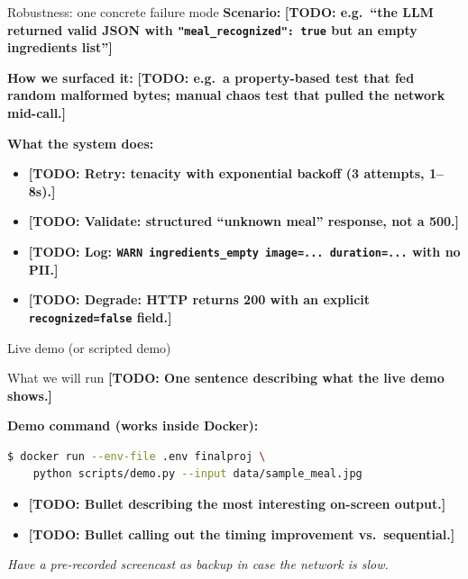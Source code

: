 \documentclass[aspectratio=169,11pt]{beamer}
\newcommand{\TODO}[1]{\textcolor{accent2}{\textbf{[TODO: #1]}}}
\begin{document}
\begin{frame}{Robustness: one concrete failure mode}
  \textbf{Scenario:} \TODO{e.g.\ ``the LLM returned valid JSON with \texttt{"meal\_recognized": true} but an empty ingredients list''}

  \vspace{0.3em}
  \textbf{How we surfaced it:} \TODO{e.g.\ a property-based test that fed random malformed bytes; manual chaos test that pulled the network mid-call.}

  \vspace{0.3em}
  \textbf{What the system does:}
  \begin{itemize}\setlength\itemsep{0.3em}
    \item \TODO{Retry: tenacity with exponential backoff (3 attempts, 1--8s).}
    \item \TODO{Validate: structured ``unknown meal'' response, not a 500.}
    \item \TODO{Log: \texttt{WARN ingredients\_empty image=... duration=...} with no PII.}
    \item \TODO{Degrade: HTTP returns 200 with an explicit \texttt{recognized=false} field.}
  \end{itemize}
\end{frame}

\begin{frame}[fragile]{Live demo (or scripted demo)}
  \begin{block}{What we will run}
    \TODO{One sentence describing what the live demo shows.}
  \end{block}

  \vspace{0.4em}
  \textbf{Demo command (works inside Docker):}
  \begin{lstlisting}[style=python,language=bash,numbers=none]
$ docker run --env-file .env finalproj \
    python scripts/demo.py --input data/sample_meal.jpg
\end{lstlisting}

  \vspace{0.4em}
  \begin{itemize}
    \item \TODO{Bullet describing the most interesting on-screen output.}
    \item \TODO{Bullet calling out the timing improvement vs.\ sequential.}
  \end{itemize}

  \vspace{0.3em}
  {\footnotesize\textit{Have a pre-recorded screencast as backup in case the network is slow.}}
\end{frame}
\end{document}
